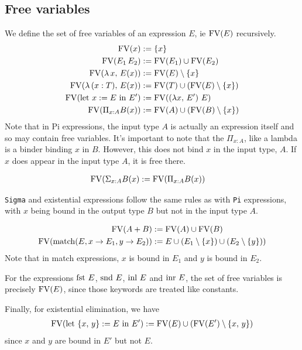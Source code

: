 \documentclass{article}
\begin{document}
\subsection{Free variables}
We define the set of free variables of an expression $E$, ie $\operatorname{FV}(E)$ recursively.
\begin{align*}
  \operatorname{FV} (x) &:= \{x\} \\
  \operatorname{FV} (E_1 \, E_2) &:= \operatorname{FV}(E_1) \cup \operatorname{FV}(E_2) \\
  \operatorname{FV} (\lambda \, x, \, E(x)) &:= \operatorname{FV}(E) \setminus \{x\} \\
  \operatorname{FV} (\lambda \, (x : T), \, E(x)) &:= \operatorname{FV}(T) \cup (\operatorname{FV}(E) \setminus \{x\}) \\
  \operatorname{FV} (\text{let } x := E \text{ in } E') &:= \operatorname{FV}((\lambda x, \, E') \,\, E) \\
  \operatorname{FV} (\Pi_{x : A} B(x)) &:= \operatorname{FV}(A) \cup (\operatorname{FV}(B) \setminus \{x\})
\end{align*}
Note that in Pi expressions, the input type $A$ is actually an expression itself
and so may contain free variables. It's important to note that the $\Pi_{x :
  A}$, like a lambda is a binder binding $x$ in $B$. However, this does not bind
$x$ in the input type, $A$. If $x$ does appear in the input type $A$, it is
free there.

\begin{align*}
 \operatorname{FV} (\Sigma_{x : A} B(x) &:= \operatorname{FV}(\Pi_{x : A} B(x))
\end{align*}

\verb|Sigma| and existential expressions follow the same rules as with \verb|Pi|
expressions, with $x$ being bound in the output type $B$ but not in the input type $A$.

\begin{align*}
  \operatorname{FV} (A + B) &:= \operatorname{FV}(A) \cup \operatorname{FV}(B) \\
  \operatorname{FV} (\operatorname{match}(E, x \rightarrow E_1, y \rightarrow E_2)) &:= 
    E \cup (E_1 \setminus \{x\}) \cup (E_2 \setminus \{y\}))
\end{align*}
Note that in match expressions, $x$ is bound in $E_1$ and $y$ is bound in $E_2$.

For the expressions $\operatorname{fst} \, E$, $\operatorname{snd} \, E$, $\operatorname{inl} \, E$ and $\operatorname{inr} \, E$, the
set of free variables is precisely $\operatorname{FV}(E)$, since those keywords are treated
like constants.

Finally, for existential elimination, we have
\begin{align*}
  \operatorname{FV}(\text{let } \{x, \, y\} := E \text{ in } E') := 
    \operatorname{FV}(E) \cup (\operatorname{FV}(E') \setminus \{x, \, y\}) 
\end{align*}
since $x$ and $y$ are bound in $E'$ but not $E$.
\end{document}
